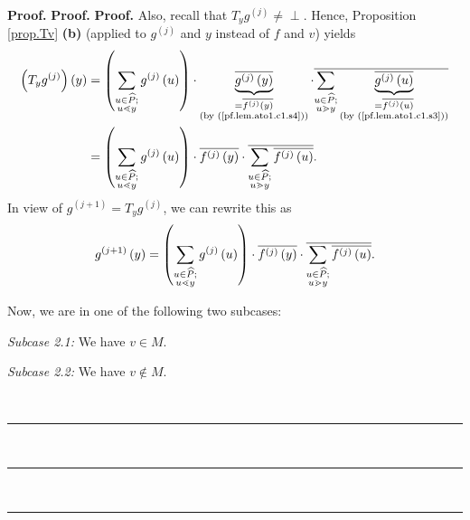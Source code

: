 \documentclass[numbers=enddot,12pt,final,onecolumn,notitlepage]{scrartcl}%
\theoremstyle{definition}
\newenvironment{verlong}{}{}
\newcommand{\undf}{\operatorname*{\bot}}
\newenvironment{proof}[1][Proof]{\noindent\textbf{#1.} }{\ \rule{0.5em}{0.5em}}
\let\sumnonlimits\sum
\renewcommand{\sum}{\sumnonlimits\limits}
\begin{document}
\begin{verlong}
\begin{proof}
\begin{proof}
\begin{proof}
Also, recall that $T_{y}g^{\left(  j\right)  }\neq\undf$. Hence, Proposition
\ref{prop.Tv} \textbf{(b)} (applied to $g^{\left(  j\right)  }$ and $y$
instead of $f$ and $v$) yields%
\begin{align*}
\left(  T_{y}g^{\left(  j\right)  }\right)  \left(  y\right)   &  =\left(
\sum\limits_{\substack{u\in\widehat{P};\\u\lessdot y}}g^{\left(  j\right)
}\left(  u\right)  \right)  \cdot\underbrace{\overline{g^{\left(  j\right)
}\left(  y\right)  }}_{\substack{=\overline{f^{\left(  j\right)  }\left(
y\right)  }\\\text{(by (\ref{pf.lem.ato1.c1.s4}))}}}\cdot\overline
{\sum\limits_{\substack{u\in\widehat{P};\\u\gtrdot y}}\underbrace{\overline
{g^{\left(  j\right)  }\left(  u\right)  }}_{\substack{=\overline{f^{\left(
j\right)  }\left(  u\right)  }\\\text{(by (\ref{pf.lem.ato1.c1.s3}))}}}}\\
&  =\left(  \sum\limits_{\substack{u\in\widehat{P};\\u\lessdot y}}g^{\left(
j\right)  }\left(  u\right)  \right)  \cdot\overline{f^{\left(  j\right)
}\left(  y\right)  }\cdot\overline{\sum\limits_{\substack{u\in\widehat{P}%
;\\u\gtrdot y}}\overline{f^{\left(  j\right)  }\left(  u\right)  }}.
\end{align*}
In view of $g^{\left(  j+1\right)  }=T_{y}g^{\left(  j\right)  }$, we can
rewrite this as
\begin{equation}
g^{\left(  j+1\right)  }\left(  y\right)  =\left(  \sum\limits_{\substack{u\in
\widehat{P};\\u\lessdot y}}g^{\left(  j\right)  }\left(  u\right)  \right)
\cdot\overline{f^{\left(  j\right)  }\left(  y\right)  }\cdot\overline
{\sum\limits_{\substack{u\in\widehat{P};\\u\gtrdot y}}\overline{f^{\left(
j\right)  }\left(  u\right)  }}. \label{pf.lem.ato1.c1.IG.pf.3g}%
\end{equation}


Now, we are in one of the following two subcases:

\textit{Subcase 2.1:} We have $v\in M$.

\textit{Subcase 2.2:} We have $v\notin M$.


\end{proof}
\end{proof}
\end{proof}
\end{verlong}
\end{document}
